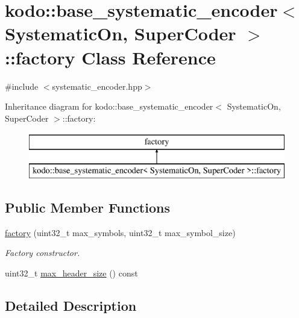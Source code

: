 \hypertarget{classkodo_1_1base__systematic__encoder_1_1factory}{\section{kodo\-:\-:base\-\_\-systematic\-\_\-encoder$<$ Systematic\-On, Super\-Coder $>$\-:\-:factory Class Reference}
\label{classkodo_1_1base__systematic__encoder_1_1factory}
}


{\ttfamily \#include $<$systematic\-\_\-encoder.\-hpp$>$}

Inheritance diagram for kodo\-:\-:base\-\_\-systematic\-\_\-encoder$<$ Systematic\-On, Super\-Coder $>$\-:\-:factory\-:\begin{figure}[H]
\begin{center}
\leavevmode
\includegraphics[height=2.000000cm]{classkodo_1_1base__systematic__encoder_1_1factory}
\end{center}
\end{figure}
\subsection*{Public Member Functions}
\begin{DoxyCompactItemize}
\item 
\hyperlink{classkodo_1_1base__systematic__encoder_1_1factory_af4ad79f51f2b32278090f42c13b9f5a8}{factory} (uint32\-\_\-t max\-\_\-symbols, uint32\-\_\-t max\-\_\-symbol\-\_\-size)
\begin{DoxyCompactList}\small\item\em Factory constructor. \end{DoxyCompactList}\item 
uint32\-\_\-t \hyperlink{classkodo_1_1base__systematic__encoder_1_1factory_a4503174ef18de62eb0b0cf64404260a2}{max\-\_\-header\-\_\-size} () const 
\begin{DoxyCompactList}\small\item\em \end{DoxyCompactList}\end{DoxyCompactItemize}


\subsection{Detailed Description}
